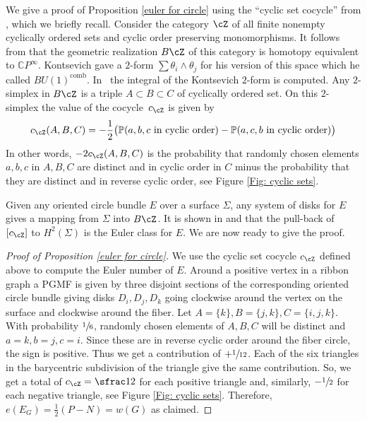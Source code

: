 We give a proof of Proposition \ref{euler for circle} using the ``cyclic set cocycle'' from \cite{I04}, which we briefly recall. Consider the category $\cZ$ of all finite nonempty cyclically ordered sets and cyclic order preserving monomorphisms. It follows from \cite{K92} that the geometric realization $B\cZ$ of this category is homotopy equivalent to $\mathbb CP^\infty$. Kontsevich gave a $2$-form $\sum \theta_i\wedge \theta_j$ for his version of this space which he called $BU(1)^\mathrm{comb}$. In~\cite{I04} the integral of the Kontsevich $2$-form is computed. Any $2$\nobreakdash-simplex in $B\cZ$ is a triple $A\subset B\subset C$ of cyclically ordered set. On this $2$\nobreakdash-simplex the value of the cocycle~$c_\cZ$ is given by
\[
c_\cZ(A,B,C)= -\frac12 \big(\mathbb P(a,b,c\text{ in cyclic order})-\mathbb P(a,c,b\text{ in cyclic order})\big)
\]
In other words, $-2c_\cZ(A,B,C)$ is the probability that randomly chosen elements $a,b,c$ in $A,B,C$ are distinct and in cyclic order in $C$ minus the probability that they are distinct and in reverse cyclic order, see Figure \ref{Fig: cyclic sets}.

Given any oriented circle bundle $E$ over a surface $\Sigma$, any system of disks for $E$ gives a mapping from $\Sigma$ into $B\cZ$. It is shown in \cite{I04} and \cite{J89} that the pull-back of~$[c_\cZ]$ to $ H^2(\Sigma)$ is the Euler class for $E$. We are now ready to give the proof.

\begin{proof}[Proof of Proposition \ref{euler for circle}]
We use the cyclic set cocycle $c_\cZ$ defined above to compute the Euler number of $E$.
Around a positive vertex in a ribbon graph a PGMF is given by three disjoint sections of the corresponding oriented circle bundle giving disks $D_i,D_j,D_k$ going clockwise around the vertex on the surface and clockwise around the fiber. Let $A=\{k\}, B=\{j,k\}, C=\{i,j,k\}$. With probability $\sfrac16$, randomly chosen elements of $A,B,C$ will be distinct and $a=k,b=j,c=i$. Since these are in reverse cyclic order around the fiber circle, the sign is positive. Thus we get a contribution of $+\sfrac1{12}$. Each of the six triangles in the barycentric subdivision of the triangle give the same contribution. So, we get a total of $c_\cZ=\sfrac12$ for each positive triangle and, similarly, $-\sfrac12$ for each negative triangle, see Figure \ref{Fig: cyclic sets}. Therefore, $e(E_G)=\frac12(P-N)=w(G)$ as claimed.
\end{proof}

